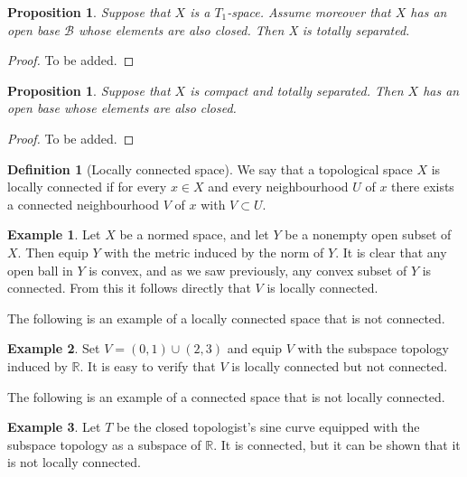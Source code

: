 \documentclass[11pt,a4paper]{article}
\theoremstyle{definition}
\newtheorem{definition}{Definition}[section]
\newtheorem{example}{Example}[section]
\theoremstyle{plain}
\newtheorem{proposition}[theorem]{Proposition}
\newcommand{\R}{\mathbb{R}}
\begin{document}
  \begin{proposition}
    Suppose that $X$ is a $T_1$-space.
    Assume moreover that $X$ has an open base $\mathcal B$ whose elements 
    are also closed. Then X is totally separated.
  \end{proposition}
  \begin{proof}
    To be added.
  \end{proof}

  \begin{proposition}
    Suppose that $X$ is compact and totally separated.
    Then $X$ has an open base whose elements are also closed.
  \end{proposition}
  \begin{proof}
    To be added.
  \end{proof}
  
  \begin{definition}[Locally connected space]
    We say that a topological space $X$ is locally connected if for every
    $x \in X$ and every neighbourhood $U$ of $x$ there exists a connected
    neighbourhood $V$ of $x$ with $V \subset U$.
  \end{definition}

  \begin{example}
    Let $X$ be a normed space, and let $Y$ be a nonempty open subset of
    $X$. Then equip $Y$ with the metric induced by the norm of $Y$.
    It is clear that any open ball in $Y$ is convex, and as we saw
    previously, any convex subset of $Y$ is connected.
    From this it follows directly that $V$ is locally connected.
  \end{example}

  The following is an example of a locally connected space that is not
  connected.

  \begin{example}
    Set $V = (0, 1) \cup (2, 3)$ and equip $V$ with the subspace topology
    induced by $\R$.
    It is easy to verify that $V$ is locally connected but not connected.
  \end{example}

  The following is an example of a connected space that is not locally 
  connected.
  
  \begin{example}
    Let $T$ be the closed topologist's sine curve equipped with the subspace
    topology as a subspace of $\R$. It is connected, but it can be shown that
    it is not locally connected.
  \end{example}
\end{document}
